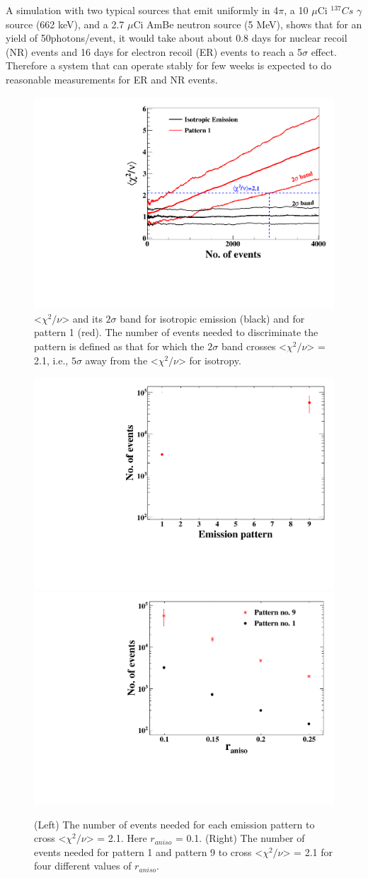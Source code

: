 A simulation with two typical sources that emit uniformly in 4$\pi$, a 10 $\mu$Ci $^{137}Cs$ $\gamma$ 
source (662 keV), and a 2.7 $\mu$Ci AmBe neutron source (5 MeV), shows that for an yield of 
50photons/event, it would take about about 0.8 days for 
nuclear recoil (NR) events and 16 days for electron recoil (ER) events to reach a 5$\sigma$ effect. 
Therefore a system that can operate stably for few weeks 
is expected to do reasonable measurements for ER and NR events.


\begin{figure}[h]
\centerline{\includegraphics[width=0.5\linewidth]{Pattern1.pdf}}
\caption{<$\chi^2/\nu$> and its $2\sigma$ band for isotropic emission (black) and for pattern 1 (red). 
The number of events needed to discriminate the pattern is defined as that for which 
the $2\sigma$ band crosses <$\chi^2/\nu$> = 2.1, i.e., $5\sigma$ away from the <$\chi^2/\nu$> for isotropy. }
\label{fig:pattern1}
\end{figure}

\begin{figure}[h]
\centering
\includegraphics[width=0.45\linewidth]{ConvergenceVsPattern.pdf}
\hspace{0.1cm}
\includegraphics[width=0.45\linewidth]{ConvergenceVsRaniso.pdf}
\caption{(Left) The number of events needed for each emission pattern to cross <$\chi^2/\nu$> = 2.1. Here 
$r_{aniso}$ = 0.1. (Right) The number of events needed for pattern 1 and pattern 9 to cross <$\chi^2/\nu$> = 2.1 
for four different values of $r_{aniso}$.}
\label{fig:convergence}
\end{figure}


